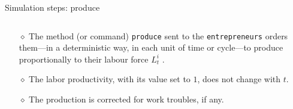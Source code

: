 \documentclass[9pt]{beamer}
\begin{document}
\begin{frame}[fragile]{Simulation steps: produce}

\begin{columns}[T]
\begin{column}{.7\textwidth}
\begin{block}{}

\begin{itemize}

\item[$\diamond$] The method (or command) \verb"produce" sent to the \verb"entrepreneurs" orders them---in a deterministic way, in each unit of time or cycle---to produce proportionally to their labour force $L^i_t$ . 

\item[$\diamond$] The labor productivity, with its value set to $1$,  does not change with $t$. 

\item[$\diamond$] The production is corrected for work troubles, if any.
     
 \end{itemize}
 
\end{block}
\end{column}

 \begin{column}{.3\textwidth}
 \vspace{-6.65\baselineskip}
 \begin{block}{}
  \end{block}
  \end{column}
    
\end{columns}

\end{frame}
\end{document}

